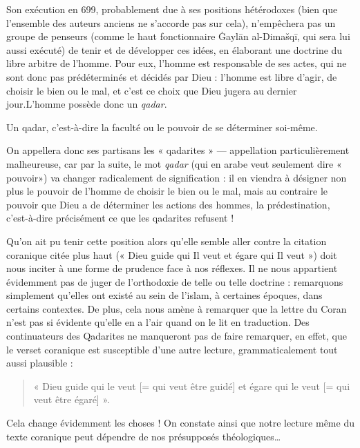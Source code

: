 Son exécution en 699, probablement due à ses positions hétérodoxes (bien
que l'ensemble des auteurs anciens ne s'accorde pas sur cela),
n'empêchera pas un groupe de penseurs (comme le haut fonctionnaire
Ġaylān al-Dimašqī, qui sera lui aussi exécuté) de tenir et de développer
ces idées, en élaborant une doctrine du libre arbitre de l'homme. Pour
eux, l'homme est responsable de ses actes, qui ne sont donc pas
prédéterminés et décidés par Dieu : l'homme est libre d'agir, de choisir
le bien ou le mal, et c'est ce choix que Dieu jugera au dernier jour.L'homme possède donc un \emph{qadar}.
\begin{Def}[qadar]
Un qadar, c'est-à-dire la faculté ou le
pouvoir de se déterminer soi-même.
\end{Def}
 On appellera donc ses partisans les «
qadarites » --- appellation particulièrement malheureuse, car par la
suite, le mot \emph{qadar} (qui en arabe veut seulement dire « pouvoir») va changer radicalement de signification : il en viendra à désigner
non plus le pouvoir de l'homme de choisir le bien ou le mal, mais au
contraire le pouvoir que Dieu a de déterminer les actions des hommes, la
prédestination, c'est-à-dire précisément ce que les qadarites refusent !

Qu'on ait pu tenir cette position alors qu'elle semble aller contre la
citation coranique citée plus haut (« Dieu guide qui Il veut et égare
qui Il veut ») doit nous inciter à une forme de prudence face à nos
réflexes. Il ne nous appartient évidemment pas de juger de l'orthodoxie
de telle ou telle doctrine : remarquons simplement qu'elles ont existé
au sein de l'islam, à certaines époques, dans certains contextes. De
plus, cela nous amène à remarquer que la lettre du Coran n'est pas si
évidente qu'elle en a l'air quand on le lit en traduction. Des
continuateurs des Qadarites ne manqueront pas de faire remarquer, en
effet, que le verset coranique est susceptible d'une autre lecture,
grammaticalement tout aussi plausible :
\begin{quote}
    « Dieu guide qui le veut {[}=
qui veut être guidé{]} et égare qui le veut {[}= qui veut être égaré{]}
».
\end{quote} 
Cela change évidemment les choses ! On constate ainsi que notre lecture même
du texte coranique
peut dépendre de nos présupposés théologiques\ldots{}

